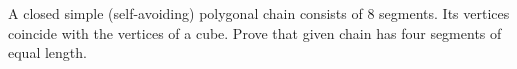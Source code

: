 \problem
A closed simple (self-avoiding) polygonal chain consists of 8 segments.
Its vertices coincide with the vertices of a cube.
Prove that given chain has four segments of equal length.
\solution
\endproblem
